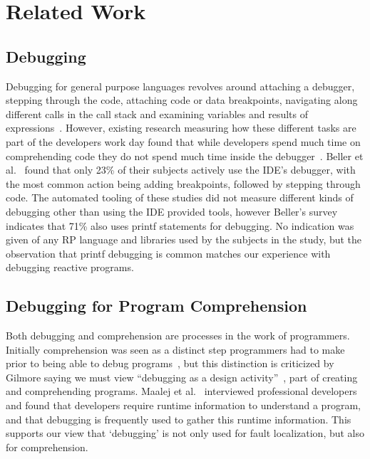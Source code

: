 \section{Related Work}

\subsection{Debugging}
Debugging for general purpose languages revolves around 
attaching a debugger,
stepping through the code, 
attaching code or data breakpoints, 
navigating along different calls in the call stack and 
examining variables and results of expressions~\cite{Spinellis2017}.
However, existing research measuring how these different tasks are part of the developers work day found that 
while developers spend much time on comprehending code they do not spend much time inside the debugger~\cite{minelli2015know}.
Beller et al.~\cite{beller2017behavior} found that only 23\% of their subjects actively use the IDE's debugger,
with the most common action being adding breakpoints, followed by stepping through code.
The automated tooling of these studies did not measure different kinds of debugging other than using the IDE provided tools, 
however Beller's survey indicates that 71\% also uses printf statements for debugging.
No indication was given of any RP language and libraries used by the subjects in the study, 
but the observation that printf debugging is common matches our experience with debugging reactive programs.



\subsection{Debugging for Program Comprehension}
Both debugging and comprehension are processes in the work of programmers.
Initially comprehension was seen as a distinct step programmers had to make
prior to being able to debug programs~\cite{katz1987debugging}, 
but this distinction is criticized by Gilmore saying we must view 
``debugging as a design activity''~\cite{gilmore1991models}, 
part of creating and comprehending programs. 
Maalej et al.~\cite{Maalej2014} interviewed professional developers 
and found that developers require runtime information to understand a program,
and that debugging is frequently used to gather this runtime information.
This supports our view that `debugging' is not only used for fault localization,
but also for comprehension.

